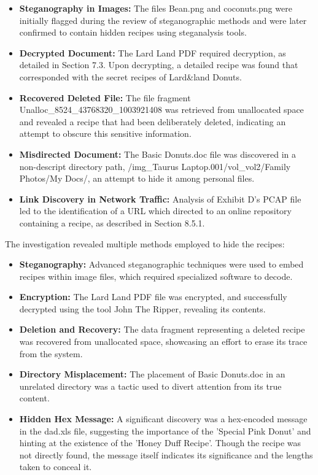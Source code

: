 \begin{itemize}
    \item \textbf{Steganography in Images:} The files Bean.png and coconuts.png were initially flagged during the review of steganographic methods and were later confirmed to contain hidden recipes using steganalysis tools.
    
    \item \textbf{Decrypted Document:} The Lard Land PDF required decryption, as detailed in Section 7.3. Upon decrypting, a detailed recipe was found that corresponded with the secret recipes of Lard\&land Donuts.
    
    \item \textbf{Recovered Deleted File:} The file fragment Unalloc\_8524\_43768320\_1003921408 was retrieved from unallocated space and revealed a recipe that had been deliberately deleted, indicating an attempt to obscure this sensitive information.
    
    \item \textbf{Misdirected Document:} The Basic Donuts.doc file was discovered in a non-descript directory path, /img\_Taurus Laptop.001/vol\_vol2/Family Photos/My Docs/, an attempt to hide it among personal files.
    
    \item \textbf{Link Discovery in Network Traffic:} Analysis of Exhibit D's PCAP file led to the identification of a URL which directed to an online repository containing a recipe, as described in Section 8.5.1.
\end{itemize}

The investigation revealed multiple methods employed to hide the recipes:

\begin{itemize}
    \item \textbf{Steganography:} Advanced steganographic techniques were used to embed recipes within image files, which required specialized software to decode.
    
    \item \textbf{Encryption:} The Lard Land PDF file was encrypted, and successfully decrypted using the tool John The Ripper, revealing its contents.
    
    \item \textbf{Deletion and Recovery:} The data fragment representing a deleted recipe was recovered from unallocated space, showcasing an effort to erase its trace from the system.
    
    \item \textbf{Directory Misplacement:} The placement of Basic Donuts.doc in an unrelated directory was a tactic used to divert attention from its true content.
    
    \item \textbf{Hidden Hex Message:} A significant discovery was a hex-encoded message in the dad.xls file, suggesting the importance of the 'Special Pink Donut' and hinting at the existence of the 'Honey Duff Recipe'. Though the recipe was not directly found, the message itself indicates its significance and the lengths taken to conceal it.
\end{itemize}

